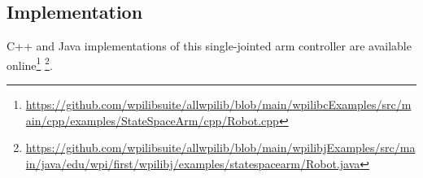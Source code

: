 \subsection{Implementation}

C++ and Java implementations of this single-jointed arm controller are available
online\footnote{\url{https://github.com/wpilibsuite/allwpilib/blob/main/wpilibcExamples/src/main/cpp/examples/StateSpaceArm/cpp/Robot.cpp}}
\footnote{\url{https://github.com/wpilibsuite/allwpilib/blob/main/wpilibjExamples/src/main/java/edu/wpi/first/wpilibj/examples/statespacearm/Robot.java}}.
